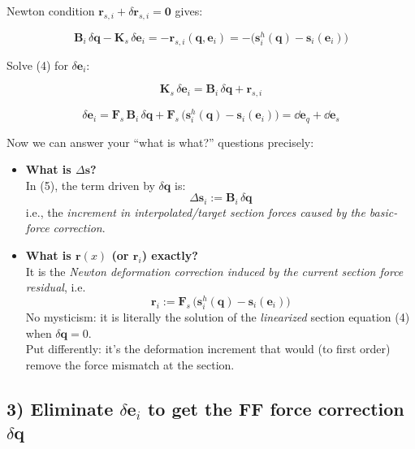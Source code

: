 Newton condition \(\mathbf{r}_{s,i}+\delta\mathbf{r}_{s,i}=\mathbf{0}\)
gives:

\[
\mathbf{B}_i\,\delta\bm{q} - \mathbf{K}_{s}\,\delta\mathbf{e}_i
=
-\mathbf{r}_{s,i}(\bm{q},\mathbf{e}_i)
=
-\big(\mathbf{s}^h_i(\bm{q})-\mathbf{s}_i(\mathbf{e}_i)\big)
\tag{4}
\]

Solve (4) for \(\delta\mathbf{e}_i\):

\[
\mathbf{K}_{s}\,\delta\mathbf{e}_i
=
\mathbf{B}_i\,\delta\bm{q}
+ \mathbf{r}_{s,i}
\]

\[
\delta\mathbf{e}_i
=
\mathbf{F}_{s}\,\mathbf{B}_i\,\delta\bm{q}
+
\mathbf{F}_{s}\,\big(\mathbf{s}^h_i(\bm{q})-\mathbf{s}_i(\mathbf{e}_i)\big)
= \dd \bm{e}_q + \dd \bm{e}_s
\tag{5}
\]

Now we can answer your ``what is what?'' questions precisely:

\begin{itemize}
\item
  \textbf{What is \(\Delta \mathbf{s}\)?}\\
  In (5), the term driven by \(\delta\bm{q}\) is: \[
  \Delta\mathbf{s}_i := \mathbf{B}_i\,\delta\bm{q}
  \] i.e., the \emph{increment in interpolated/target section forces
  caused by the basic-force correction}.
\item
  \textbf{What is $\mathbf{r}(x)$ (or \(\mathbf{r}_i\)) exactly?}\\
  It is the \emph{Newton deformation correction induced by the current
  section force residual}, i.e. \[
  \boxed{
  \mathbf{r}_i
  :=
  \mathbf{F}_{s}\,\big(\mathbf{s}^h_i(\bm{q})-\mathbf{s}_i(\mathbf{e}_i)\big)
  }
  \tag{6}
  \] No mysticism: it is literally the solution of the \emph{linearized}
  section equation (4) when \(\delta\bm{q}=0\).\\
  Put differently: it's the deformation increment that would (to first
  order) remove the force mismatch at the section.
\end{itemize}


\subsection{\texorpdfstring{3) Eliminate \(\delta\mathbf{e}_i\) to get
the FF force correction
\(\delta\bm{q}\)}{3) Eliminate \textbackslash delta\textbackslash mathbf\{e\}\_i to get the FF force correction \textbackslash delta\textbackslash mathbf\{q\}}}\label{eliminate-deltamathbfe_i-to-get-the-ff-force-correction-deltamathbfq}


